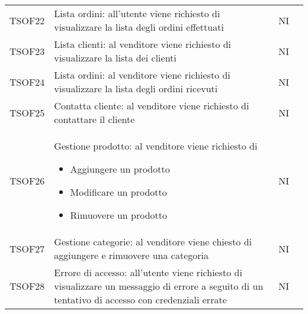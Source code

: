 \begin{center}
\begin{longtable}[!h]{p{50px} p{245px} p{75px} p{50px}}
        TSOF22                           & Lista ordini: all'utente viene richiesto di visualizzare la lista degli ordini effettuati                                                        & NI             \\
        TSOF23                           & Lista clienti: al venditore viene richiesto di visualizzare la lista dei clienti                                                                 & NI             \\
        TSOF24                           & Lista ordini: al venditore viene richiesto di visualizzare la lista degli ordini ricevuti                                                        & NI             \\
        TSOF25                           & Contatta cliente: al venditore viene richiesto di contattare il cliente                                                                          & NI             \\
        TSOF26                           & Gestione prodotto: al venditore viene richiesto di \begin{itemize} \item Aggiungere un prodotto \item Modificare un prodotto \item Rimuovere un prodotto \end{itemize}                                                                    & NI             \\
        TSOF27                           & Gestione categorie: al venditore viene chiesto di aggiungere e rimuovere una categoria                                                           & NI             \\
        TSOF28                           & Errore di accesso: all'utente viene richiesto di visualizzare un messaggio di errore a seguito di un tentativo di accesso con credenziali errate & NI             \\
    \end{longtable}
\end{center}